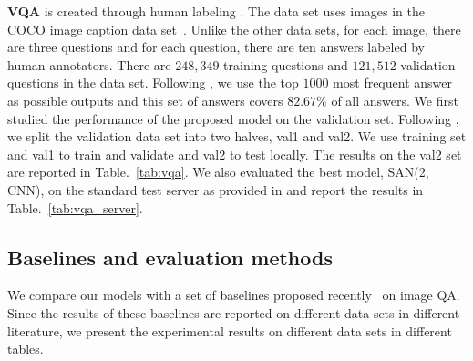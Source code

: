 \documentclass[10pt,twocolumn,letterpaper]{article}
\begin{document}
{\bf VQA} is created through human labeling \cite{antol2015vqa}. The data set
uses images in the COCO image caption data set~\cite{lin2014microsoft}. Unlike
the other data sets, for each image, there are three questions and for each
question, there are ten answers labeled by human annotators. There are
$248,349$ training questions and $121,512$ validation questions in the data %
set. Following \cite{antol2015vqa}, we use the top $1000$ most frequent answer
as possible outputs and this set of answers covers $82.67\%$ of all answers.
We first studied the performance of the proposed model on the validation set.
Following \cite{fang2014captions}, we split the validation data set into two
halves, val1 and val2. We use training set and val1 to train and validate and
val2 to test locally. The results on the val2 set are reported in
Table.~\ref{tab:vqa}. We also evaluated the best model, SAN(2, CNN), on the
standard test server as provided in \cite{antol2015vqa} and report the results
in Table.~\ref{tab:vqa_server}.


\subsection{Baselines and evaluation methods}
We compare our models with a set of baselines proposed
recently~\cite{ren2015imageqa, antol2015vqa, malinowski2014multi,
  malinowski2015ask, ma2015learning} on image QA. Since the results of these
baselines are reported on different data sets in different literature, we
present the experimental results on different data sets in different tables.
\end{document}
